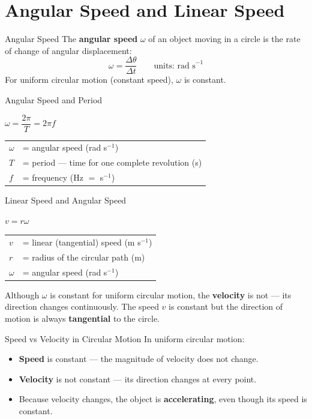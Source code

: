 \section{Angular Speed and Linear Speed}

\begin{definitionbox}{Angular Speed}
The \textbf{angular speed} $\omega$ of an object moving in a circle is the rate of change of angular displacement:
$$\omega = \frac{\Delta\theta}{\Delta t} \qquad \text{units: rad s}^{-1}$$
For uniform circular motion (constant speed), $\omega$ is constant.
\end{definitionbox}

\begin{formulabox}{Angular Speed and Period}
\begin{center}
\Large $\omega = \dfrac{2\pi}{T} = 2\pi f$
\end{center}
\vspace{0.3em}
\begin{tabular}{@{}ll@{}}
$\omega$ & = angular speed (rad s$^{-1}$) \\
$T$ & = period — time for one complete revolution (s) \\
$f$ & = frequency (Hz $= $ s$^{-1}$) \\
\end{tabular}
\end{formulabox}

\begin{formulabox}{Linear Speed and Angular Speed}
\begin{center}
\Large $v = r\omega$
\end{center}
\vspace{0.3em}
\begin{tabular}{@{}ll@{}}
$v$ & = linear (tangential) speed (m s$^{-1}$) \\
$r$ & = radius of the circular path (m) \\
$\omega$ & = angular speed (rad s$^{-1}$) \\
\end{tabular}
\vspace{0.4em}

Although $\omega$ is constant for uniform circular motion, the \textbf{velocity} is not — its direction changes continuously. The speed $v$ is constant but the direction of motion is always \textbf{tangential} to the circle.
\end{formulabox}

\begin{warningbox}{Speed vs Velocity in Circular Motion}
In uniform circular motion:
\begin{itemize}[itemsep=2pt]
  \item \textbf{Speed} is constant — the magnitude of velocity does not change.
  \item \textbf{Velocity} is not constant — its direction changes at every point.
  \item Because velocity changes, the object is \textbf{accelerating}, even though its speed is constant.
\end{itemize}
\end{warningbox}

